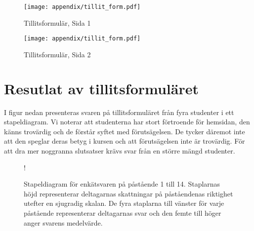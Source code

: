\begin{figure}[H]
    \centering
    \texttt{[image: appendix/tillit\_form.pdf]}
    \caption*{Tillitsformulär, Sida 1}
    \label{fig:tillit_form1}
\end{figure}

\begin{figure}[H]
    \centering
    \texttt{[image: appendix/tillit\_form.pdf]}
    \caption*{Tillitsformulär, Sida 2}
    \label{fig:tillit_form2}
\end{figure}



\section{Resutlat av tillitsformuläret}
\label{app:resultattillit}
I figur nedan presenteras svaren på tillitsformuläret från fyra studenter i ett stapeldiagram. Vi noterar att studenterna har stort förtroende för hemsidan, den känns trovärdig och de förstår syftet med förutsägelsen. De tycker däremot inte att den speglar deras betyg i kursen och att förutsägelsen inte är trovärdig. För att dra mer noggranna slutsatser krävs svar från en större mängd studenter.


\begin{figure}[hbtp]
    \centering
    \resizebox {\textwidth} {!} {
        
    }
    \caption{Stapeldiagram för enkätsvaren på påstående 1 till 14. Staplarnas höjd representerar deltagarnas skattningar på påståendenas riktighet utefter en sjugradig skalan. De fyra staplarna till vänster för varje påstående representerar deltagarnas svar och den femte till höger anger svarens medelvärde.}
    \label{fig:form_answers}
\end{figure}
